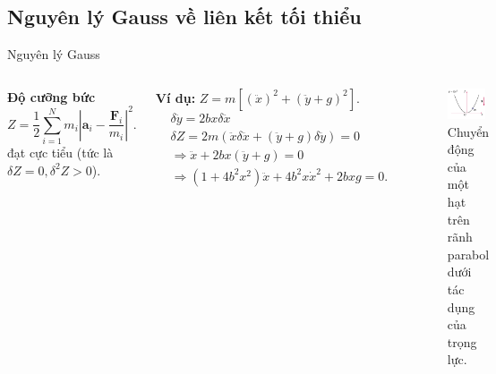 \subsection{Nguyên lý Gauss về liên kết tối thiểu}

\begin{frame}{Nguyên lý Gauss}

\begin{columns}
    \textbf{Độ cưỡng bức}
    \begin{equation}
        Z = \frac{1}{2} \sum_{i=1}^{N} m_i \left| \mathbf{a}_i - \frac{\mathbf{F}_i}{m_i} \right|^2.
    \end{equation}
    đạt cực tiểu (tức là \(\delta Z = 0, \delta^2 Z > 0\)).

    \textbf{Ví dụ:} \( Z = m \left[ \left( \ddot{x} \right)^2 + \left( \ddot{y} + g \right)^2 \right]\).
    \vspace{-2mm}
    \begin{align}
        & \delta \ddot{y} = 2 b x \delta \ddot{x} \\
        & \delta Z = 2m \left( \ddot{x} \delta \ddot{x} + \left( \ddot{y} + g \right) \delta \ddot{y} \right) = 0 \\
        & \Rightarrow \ddot{x} + 2b x \left( \ddot{y} + g \right) = 0 \\
        & \Rightarrow \left( 1 + 4 b^2 x^2 \right) \ddot{x} + 4 b^2 x \dot{x}^2 + 2 b x g = 0.
    \end{align}

    \vspace{-6mm}
    \begin{figure}
        \centering
        \includegraphics[width=0.9\textwidth]{Figures/Parabol_motion.pdf}
        \vspace{-2mm}
        \caption{Chuyển động của một hạt trên rãnh parabol dưới tác dụng của trọng lực.}
    \end{figure}
\end{columns}

\end{frame}


